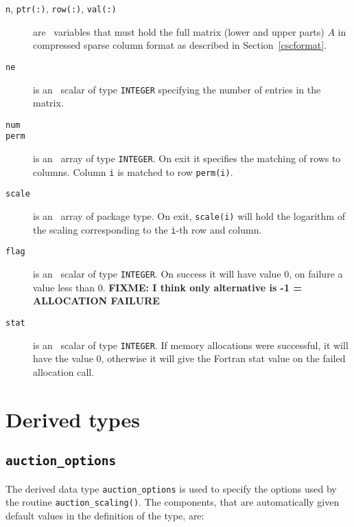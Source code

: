 \begin{description}

\item[\texttt{n}, \texttt{ptr(:)}, \texttt{row(:)}, \texttt{val(:)}] are
\intentin\ variables that must hold the full matrix (lower and upper parts)
$A$ in compressed sparse column format as described in Section~\ref{cscformat}.

\item[\texttt{ne}] is an \intentin\ scalar of type {\tt INTEGER} specifying the
number of entries in the matrix.

\item[\texttt{num}]

\item[\texttt{perm}] is an \intentout\ array of type {\tt INTEGER}. On exit it
specifies the matching of rows to columns. Column \texttt{i} is matched to row
\texttt{perm(i)}.

\item[\texttt{scale}] is an \intentout\ array of package type. On exit,
\texttt{scale(i)} will hold the logarithm of the scaling corresponding to the
\texttt{i}-th row and column.

\item[\texttt{flag}] is an \intentout\ scalar of type {\tt INTEGER}. On success it will have value 0, on failure a value less than 0. \textbf{FIXME: I think only alternative is -1 = ALLOCATION FAILURE}

\item[\texttt{stat}] is an \intentout\ scalar of type {\tt INTEGER}. If memory allocations were successful, it will have the value 0, otherwise it will give the
Fortran stat value on the failed allocation call.

\end{description}

\section{Derived types}
\subsection{\texttt{auction\_options}} \label{type:auction_options}

The derived data type \texttt{auction\_options} is used to specify the options used by the routine \texttt{auction\_scaling()}. The components, that are automatically given default values in the definition of the type, are:

